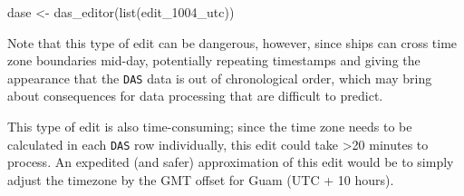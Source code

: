 \documentclass[
]{book}
\newenvironment{Shaded}{\begin{snugshade}}{\end{snugshade}}
\newcommand{\CommentTok}[1]{\textcolor[rgb]{0.56,0.35,0.01}{\textit{#1}}}
\newcommand{\DecValTok}[1]{\textcolor[rgb]{0.00,0.00,0.81}{#1}}
\newcommand{\FunctionTok}[1]{\textcolor[rgb]{0.00,0.00,0.00}{#1}}
\newcommand{\NormalTok}[1]{#1}
\newcommand{\OtherTok}[1]{\textcolor[rgb]{0.56,0.35,0.01}{#1}}
\newcommand{\SpecialCharTok}[1]{\textcolor[rgb]{0.00,0.00,0.00}{#1}}
\newcommand{\StringTok}[1]{\textcolor[rgb]{0.31,0.60,0.02}{#1}}
\begin{document}
\begin{Shaded}
\begin{Highlighting}[]
\NormalTok{dase }\OtherTok{\textless{}{-}} \FunctionTok{das\_editor}\NormalTok{(}\FunctionTok{list}\NormalTok{(edit\_1004\_utc))}
\end{Highlighting}
\end{Shaded}

\begin{Shaded}
\end{Shaded}

Note that this type of edit can be dangerous, however, since ships can cross time zone boundaries mid-day, potentially repeating timestamps and giving the appearance that the \texttt{DAS} data is out of chronological order, which may bring about consequences for data processing that are difficult to predict.

This type of edit is also time-consuming; since the time zone needs to be calculated in each \texttt{DAS} row individually, this edit could take \textgreater20 minutes to process. An expedited (and safer) approximation of this edit would be to simply adjust the timezone by the GMT offset for Guam (UTC + 10 hours).
\end{document}
